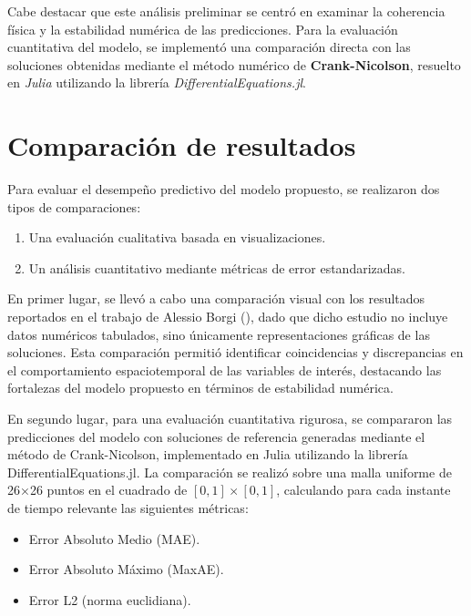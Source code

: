 \documentclass[
  spanish,
  us-letterpaper,
]{scrreprt}
\providecommand{\tightlist}{%
  \setlength{\itemsep}{0pt}\setlength{\parskip}{0pt}}
\theoremstyle{plain}
\theoremstyle{definition}
\theoremstyle{remark}
\begin{document}
Cabe destacar que este análisis preliminar se centró en examinar la
coherencia física y la estabilidad numérica de las predicciones. Para la
evaluación cuantitativa del modelo, se implementó una comparación
directa con las soluciones obtenidas mediante el método numérico de
\textbf{Crank-Nicolson}, resuelto en \emph{Julia} utilizando la librería
\emph{DifferentialEquations.jl}.

\section{Comparación de resultados}\label{comparaciuxf3n-de-resultados}

Para evaluar el desempeño predictivo del modelo propuesto, se realizaron
dos tipos de comparaciones:

\begin{enumerate}
\def\labelenumi{\arabic{enumi}.}
\tightlist
\item
  Una evaluación cualitativa basada en visualizaciones.
\item
  Un análisis cuantitativo mediante métricas de error estandarizadas.
\end{enumerate}

En primer lugar, se llevó a cabo una comparación visual con los
resultados reportados en el trabajo de Alessio Borgi
(), dado que dicho estudio no incluye
datos numéricos tabulados, sino únicamente representaciones gráficas de
las soluciones. Esta comparación permitió identificar coincidencias y
discrepancias en el comportamiento espaciotemporal de las variables de
interés, destacando las fortalezas del modelo propuesto en términos de
estabilidad numérica.

En segundo lugar, para una evaluación cuantitativa rigurosa, se
compararon las predicciones del modelo con soluciones de referencia
generadas mediante el método de Crank-Nicolson, implementado en Julia
utilizando la librería DifferentialEquations.jl. La comparación se
realizó sobre una malla uniforme de 26×26 puntos en el cuadrado de
\([0,1]\times[0,1]\), calculando para cada instante de tiempo relevante
las siguientes métricas:

\begin{itemize}
\tightlist
\item
  Error Absoluto Medio (MAE).
\item
  Error Absoluto Máximo (MaxAE).
\item
  Error L2 (norma euclidiana).
\end{itemize}
\end{document}
